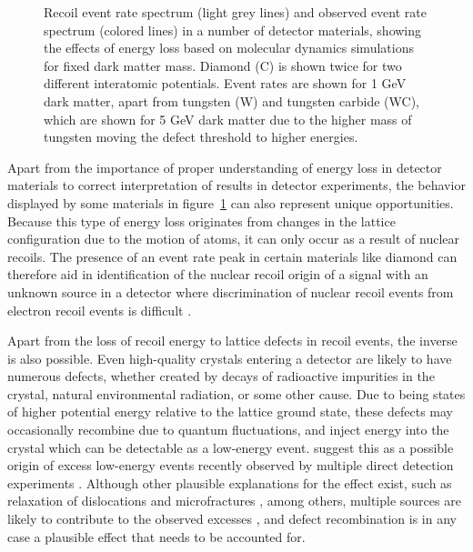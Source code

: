 \begin{figure}
    \caption{Recoil event rate spectrum (light grey lines) and observed event rate spectrum (colored lines) in a number of detector materials, showing the effects of energy loss based on molecular dynamics simulations for fixed dark matter mass. Diamond (C) is shown twice for two different interatomic potentials. Event rates are shown for 1 GeV dark matter, apart from tungsten (W) and tungsten carbide (WC), which are shown for 5 GeV dark matter due to the higher mass of tungsten moving the defect threshold to higher energies.}
    \label{fig:event-rate-eloss}
\end{figure}

Apart from the importance of proper understanding of energy loss in detector materials to correct interpretation of results in detector experiments, the behavior displayed by some materials in figure~\ref{fig:event-rate-eloss} can also represent unique opportunities. Because this type of energy loss originates from changes in the lattice configuration due to the motion of atoms, it can only occur as a result of nuclear recoils. The presence of an event rate peak in certain materials like diamond can therefore aid in identification of the nuclear recoil origin of a signal with an unknown source in a detector where discrimination of nuclear recoil events from electron recoil events is difficult \parencite{HeikinheimoEtAl2022}.

Apart from the loss of recoil energy to lattice defects in recoil events, the inverse is also possible. Even high-quality crystals entering a detector are likely to have numerous defects, whether created by decays of radioactive impurities in the crystal, natural environmental radiation, or some other cause. Due to being states of higher potential energy relative to the lattice ground state, these defects may occasionally recombine due to quantum fluctuations, and inject energy into the crystal which can be detectable as a low-energy event. \textcite{NordlundEtAl2024} suggest this as a possible origin of excess low-energy events recently observed by multiple direct detection experiments \parencites{CRESSTIII2019, DAMIC2020, EDELWEISS2020, NUCLEUS2020, SENSEI2020, SuperCDMS2020}. Although other plausible explanations for the effect exist, such as relaxation of dislocations and microfractures \parencites{AnthonyPetersen2024, Romani2024}, among others, multiple sources are likely to contribute to the observed excesses \parencite{AdariEtAl2022}, and defect recombination is in any case a plausible effect that needs to be accounted for.

